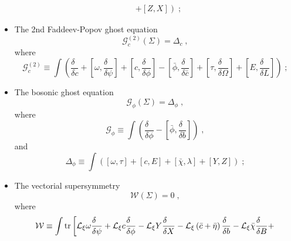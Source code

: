 \documentclass[../main.tex]{subfiles}
\begin{document}
\begin{itemize}
\begin{align}
                   & + \left. \left[Z,X\right] \right) \;;
        \end{align}
  \item The 2nd Faddeev-Popov ghost equation
        \begin{equation}
          \label{eq:2ndfpghosteq}
          \mathcal{G}^{\left(2\right)}_c \left(\Sigma\right)=\Delta_c \;,
        \end{equation}
        where
        \begin{equation}
          \label{eq:2ndfpghostop}
          \mathcal{G}^{\left(2\right)}_c \equiv \int \left(\frac{\delta\phantom{c}}{\delta c}+\left[\omega ,\frac{\delta\phantom{\psi}}{\delta \psi}\right]+\left[c,\frac{\delta\phantom{\phi}}{\delta \phi}\right]-\left[\bar{\phi},\frac{\delta\phantom{\bar{c}}}{\delta\bar{c}}\right]+\left[\tau,\frac{\delta\phantom{\Omega}}{\delta \Omega}\right]+\left[E,\frac{\delta\phantom{L}}{\delta L}\right]\right)\;;
        \end{equation}
  \item The bosonic ghost equation
        \begin{equation}
          \mathcal{G}_\phi \left(\Sigma\right) = \Delta_\phi \;,
        \end{equation}
        where
        \begin{equation}
          \mathcal{G}_\phi \equiv \int \left(\frac{\delta\phantom{\phi}}{\delta\phi}-\left[\bar{\phi},\frac{\delta\phantom{b}}{\delta b}\right]\right) \;,
        \end{equation}
        and
        \begin{equation}
          \label{eq:linearbreakphi}
          \Delta_\phi \equiv \int \left(\left[\omega ,\tau\right]+\left[c,E\right]+\left[\bar{\chi},\lambda\right]+\left[Y,Z\right]\right) \;;
        \end{equation}
  \item  The vectorial supersymmetry
        \begin{equation}
          \label{eq:vecsusyeq}
          \mathcal{W}\left(\Sigma\right)=0 \;,
        \end{equation}
        where
        \begin{align}
          \label{eq:vecsusyop}
          \mathcal{W} & \equiv \int \tr \left[\mathcal{L}_\xi \omega \frac{\delta\phantom{\psi}}{\delta\psi}+\mathcal{L}_\xi c\frac{\delta\phantom{\phi}}{\delta\phi} - \mathcal{L}_\xi Y \frac{\delta\phantom{X}}{\delta X}-\mathcal{L}_\xi\left(\bar{c}+\bar{\eta}\right)\frac{\delta\phantom{b}}{\delta b} - \mathcal{L}_\xi \bar{\chi}\frac{\delta\phantom{B}}{\delta B}+ \right. \nonumber \\

\end{align}
\end{itemize}
\end{document}
